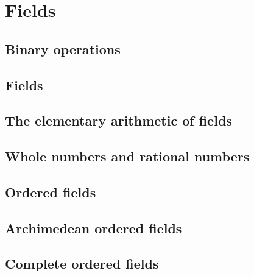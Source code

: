 \chapter{Fields}
\section{Binary operations}


\section{Fields}
\section{The elementary arithmetic of fields}
\section{Whole numbers and rational numbers}
\section{Ordered fields}
\section{Archimedean ordered fields}
\section{Complete ordered fields}

